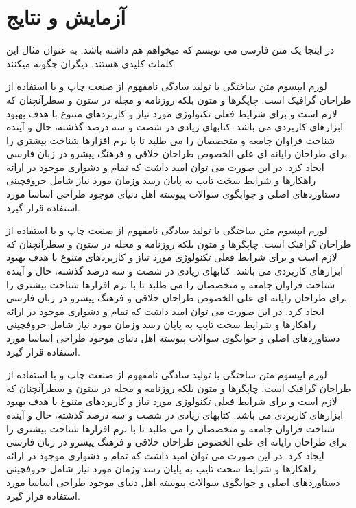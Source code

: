 \chapter{آزمایش و نتایج}

\clearpage
در اینجا یک متن فارسی می نویسم که میخواهم  هم داشته باشد.
به عنوان مثال این  کلمات کلیدی هستند.
دیگران چگونه  میکنند

لورم ایپسوم متن ساختگی با تولید سادگی نامفهوم از صنعت چاپ و با استفاده از طراحان گرافیک است. چاپگرها و متون بلکه روزنامه و مجله در ستون و سطرآنچنان که لازم است و برای شرایط فعلی تکنولوژی مورد نیاز و کاربردهای متنوع با هدف بهبود ابزارهای کاربردی می باشد. کتابهای زیادی در شصت و سه درصد گذشته، حال و آینده شناخت فراوان جامعه و متخصصان را می طلبد تا با نرم افزارها شناخت بیشتری را برای طراحان رایانه ای علی الخصوص طراحان خلاقی و فرهنگ پیشرو در زبان فارسی ایجاد کرد. در این صورت می توان امید داشت که تمام و دشواری موجود در ارائه راهکارها و شرایط سخت تایپ به پایان رسد وزمان مورد نیاز شامل حروفچینی دستاوردهای اصلی و جوابگوی سوالات پیوسته اهل دنیای موجود طراحی اساسا مورد استفاده قرار گیرد.

لورم ایپسوم متن ساختگی با تولید سادگی نامفهوم از صنعت چاپ و با استفاده از طراحان گرافیک است. چاپگرها و متون بلکه روزنامه و مجله در ستون و سطرآنچنان که لازم است و برای شرایط فعلی تکنولوژی مورد نیاز و کاربردهای متنوع با هدف بهبود ابزارهای کاربردی می باشد. کتابهای زیادی در شصت و سه درصد گذشته، حال و آینده شناخت فراوان جامعه و متخصصان را می طلبد تا با نرم افزارها شناخت بیشتری را برای طراحان رایانه ای علی الخصوص طراحان خلاقی و فرهنگ پیشرو در زبان فارسی ایجاد کرد. در این صورت می توان امید داشت که تمام و دشواری موجود در ارائه راهکارها و شرایط سخت تایپ به پایان رسد وزمان مورد نیاز شامل حروفچینی دستاوردهای اصلی و جوابگوی سوالات پیوسته اهل دنیای موجود طراحی اساسا مورد استفاده قرار گیرد.

لورم ایپسوم متن ساختگی با تولید سادگی نامفهوم از صنعت چاپ و با استفاده از طراحان گرافیک است. چاپگرها و متون بلکه روزنامه و مجله در ستون و سطرآنچنان که لازم است و برای شرایط فعلی تکنولوژی مورد نیاز و کاربردهای متنوع با هدف بهبود ابزارهای کاربردی می باشد. کتابهای زیادی در شصت و سه درصد گذشته، حال و آینده شناخت فراوان جامعه و متخصصان را می طلبد تا با نرم افزارها شناخت بیشتری را برای طراحان رایانه ای علی الخصوص طراحان خلاقی و فرهنگ پیشرو در زبان فارسی ایجاد کرد. در این صورت می توان امید داشت که تمام و دشواری موجود در ارائه راهکارها و شرایط سخت تایپ به پایان رسد وزمان مورد نیاز شامل حروفچینی دستاوردهای اصلی و جوابگوی سوالات پیوسته اهل دنیای موجود طراحی اساسا مورد استفاده قرار گیرد.

